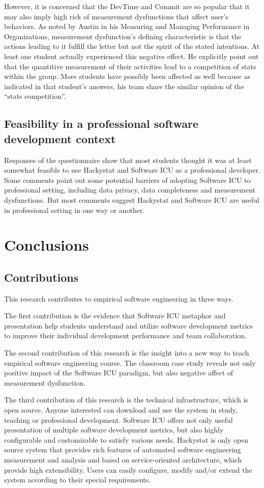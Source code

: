 However, it is concerned that the DevTime and Commit are so popular that it may also imply high rick of measurement dysfunctions that affect user's behaviors. As noted by Austin in his Measuring and Managing Performance in Organizations\cite{Austin96}, measurement dysfunction’s defining characteristic is that the actions leading to it fulfill the letter but not the spirit of the stated intentions. At least one student actually experienced this negative effect. He explicitly point out that the quantitive measurement of their activities lead to a competition of stats within the group. More students have possibly been affected as well because as indicated in that student's answers, his team share the similar opinion of the ``stats competition''.

\section {Feasibility in a professional software development context}
Responses of the questionnaire show that most students thought it was at least somewhat feasible to use Hackystat and Software ICU as a professional developer. Some comments point out some potential barriers of adopting Software ICU to professional setting, including data privacy, data completeness and measurement dysfunctions. But most comments suggest Hackystat and Software ICU are useful in professional setting in one way or another.


\chapter{Conclusions}

\section{Contributions}
This research contributes to empirical software engineering in three ways.

The first contribution is the evidence that Software ICU metaphor and presentation help students understand and utilize software development metrics to improve their individual development performance and team collaboration.

The second contribution of this research is the insight into a new way to teach empirical software engineering course. The classroom case study reveals not only positive impact of the Software ICU paradigm, but also negative affect of measurement dysfunction.

The third contribution of this research is the technical infrastructure, which is open source. Anyone interested can download and use the system in study, teaching or professional development. Software ICU offers not only useful presentation of multiple software development metrics, but also highly configurable and customizable to satisfy various needs. Hackystat is only open source system that provides rich features of automated software engineering measurement and analysis and based on service-oriented architecture, which provide high extensibility. Users can easily configure, modify and/or extend the system according to their special requirements.


